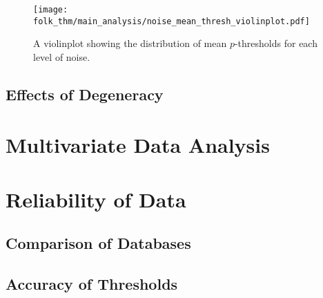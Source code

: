 \begin{figure}
    \centering
    \texttt{[image: folk\_thm/main\_analysis/noise\_mean\_thresh\_violinplot.pdf]}
    \caption{A violinplot showing the distribution of mean \(p\)-thresholds for each level of noise.}\label{fig:noise_mean_thresh_violinplot}
\end{figure}



\subsection{Effects of Degeneracy}\label{subsec:Effects_of_Degeneracy}

\section{Multivariate Data Analysis}\label{sec:MV_Data_Analysis}

\section{Reliability of Data}\label{sec:Reliability_of_Data}

\subsection{Comparison of Databases}\label{subsec:Comparison_of_Databases}

\subsection{Accuracy of Thresholds}\label{subsec:Accuracy_of_Thresholds}